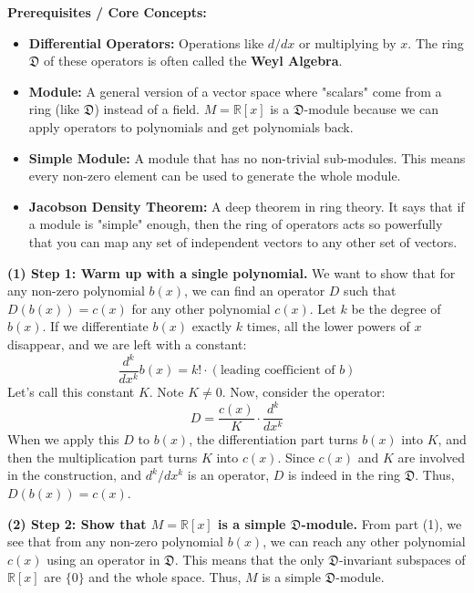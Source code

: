 \begin{solution}
\textbf{Prerequisites / Core Concepts:}
\begin{itemize}
    \item \textbf{Differential Operators:} Operations like $d/dx$ or multiplying by $x$. The ring $\mathfrak{D}$ of these operators is often called the \textbf{Weyl Algebra}.
    \item \textbf{Module:} A general version of a vector space where "scalars" come from a ring (like $\mathfrak{D}$) instead of a field. $M = \mathbb{R}[x]$ is a $\mathfrak{D}$-module because we can apply operators to polynomials and get polynomials back.
    \item \textbf{Simple Module:} A module that has no non-trivial sub-modules. This means every non-zero element can be used to generate the whole module.
    \item \textbf{Jacobson Density Theorem:} A deep theorem in ring theory. It says that if a module is "simple" enough, then the ring of operators acts so powerfully that you can map any set of independent vectors to any other set of vectors.
\end{itemize}

\textbf{(1) Step 1: Warm up with a single polynomial.}
We want to show that for any non-zero polynomial $b(x)$, we can find an operator $D$ such that $D(b(x)) = c(x)$ for any other polynomial $c(x)$.
Let $k$ be the degree of $b(x)$. If we differentiate $b(x)$ exactly $k$ times, all the lower powers of $x$ disappear, and we are left with a constant:
\[ \frac{d^k}{dx^k} b(x) = k! \cdot (\text{leading coefficient of } b) \]
Let's call this constant $K$. Note $K \neq 0$.
Now, consider the operator:
\[ D = \frac{c(x)}{K} \cdot \frac{d^k}{dx^k} \]
When we apply this $D$ to $b(x)$, the differentiation part turns $b(x)$ into $K$, and then the multiplication part turns $K$ into $c(x)$.
Since $c(x)$ and $K$ are involved in the construction, and $d^k/dx^k$ is an operator, $D$ is indeed in the ring $\mathfrak{D}$. Thus, $D(b(x)) = c(x)$.

\textbf{(2) Step 2: Show that $M = \mathbb{R}[x]$ is a simple $\mathfrak{D}$-module.}
From part (1), we see that from any non-zero polynomial $b(x)$, we can reach any other polynomial $c(x)$ using an operator in $\mathfrak{D}$. 
This means that the only $\mathfrak{D}$-invariant subspaces of $\mathbb{R}[x]$ are $\{0\}$ and the whole space. Thus, $M$ is a simple $\mathfrak{D}$-module.


\end{solution}
